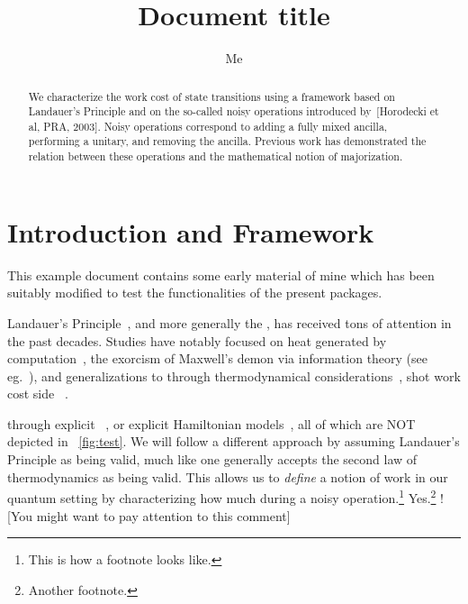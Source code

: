 \documentclass[10pt,a4paper,aps,reprint,notitlepage]{revtex4-1}
\begin{document}
\title{Document title}
\author{Me}
\begin{abstract}
  We characterize the work cost of state transitions using a framework based on
  Landauer's Principle and on the so-called noisy operations introduced
  by~[Horodecki et al, PRA, 2003]. Noisy operations correspond to adding a fully
  mixed ancilla, performing a unitary, and removing the ancilla. Previous work
  has demonstrated the relation between these operations and the mathematical
  notion of majorization.
\end{abstract}
\maketitle

\section{Introduction and Framework}

This example document contains some early material of mine which has been
suitably modified to test the functionalities of the present packages.

Landauer's Principle~\cite{Landauer1961_5392446Erasure}, and more generally the
,
 \jd has received tons of attention \endjd in the
past decades.  Studies have notably focused on heat generated by
computation~\cite{Bennett1982IJTP_ThermodynOfComp}, the exorcism of Maxwell's
demon via information theory (see eg.~\cite{Bennett2003_NotesLP}), and
generalizations to  through thermodynamical
considerations~\cite{Oppenheim2002PRL_thermodynamical},  shot work cost   side
~\cite{delRio2011Nature}.

 through explicit ~\cite{Szilard1929ZeitschriftFuerPhysik,Dahlsten2011NJP_inadequacy}, or
explicit Hamiltonian models~\cite{Alicki2004_hamiltonian}, all of which are NOT
depicted in \figurename~\ref{fig:test}. We will follow a different approach by
assuming Landauer's Principle as being valid, much like one generally accepts
the second law of thermodynamics as being valid. This allows us to {\em define}
a notion of work in our quantum setting by characterizing how much
 during a noisy
operation.\footnote{This is how a footnote looks like.} Yes.\footnote{Another
  footnote.} \ccsix![You might want to pay attention to this comment]
\end{document}
